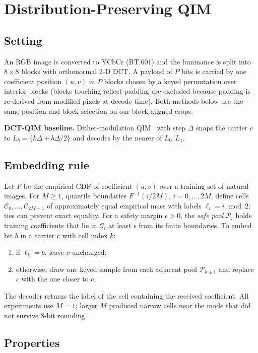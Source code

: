 \documentclass[conference,10pt]{IEEEtran}
\begin{document}
\section{Distribution-Preserving QIM}
\label{sec:method}

\subsection{Setting}
An RGB image is converted to YCbCr (BT.601) and the luminance is split into
$8{\times}8$ blocks with orthonormal 2-D DCT. A payload of $P$ bits is carried
by one coefficient position $(u,v)$ in $P$ blocks chosen by a keyed
permutation over interior blocks (blocks touching reflect-padding are excluded
because padding is re-derived from modified pixels at decode time). Both
methods below use the same position and block selection on our block-aligned crops.

\textbf{DCT-QIM baseline.} Dither-modulation QIM~\cite{Chen2001qim} with step
$\Delta$ snaps the carrier $c$ to $L_b = \{k\Delta + b\Delta/2\}$ and decodes
by the nearer of $L_0, L_1$.

\subsection{Embedding rule}
Let $F$ be the empirical CDF of coefficient $(u,v)$ over a training set of
natural images. For $M\geq1$, quantile boundaries
$F^{-1}(i/2M)$, $i=0,\dots,2M$, define cells $\mathcal{C}_0,\dots,\mathcal{C}_{2M-1}$
of approximately equal empirical mass with labels $\ell_i = i \bmod 2$;
ties can prevent exact equality. For a safety margin
$\epsilon>0$, the \emph{safe pool} $\mathcal{P}_i$ holds training coefficients
that lie in $\mathcal{C}_i$ at least $\epsilon$ from its finite boundaries.
To embed bit $b$ in a carrier $c$ with cell index $k$:
\begin{enumerate}
\item if $\ell_k = b$, leave $c$ unchanged;
\item otherwise, draw one keyed sample from each adjacent pool
$\mathcal{P}_{k\pm1}$ and replace $c$ with the one closer to $c$.
\end{enumerate}
The decoder returns the label of the cell containing the received
coefficient. All experiments use $M=1$; larger $M$ produced narrow cells near
the mode that did not survive 8-bit rounding.

\subsection{Properties}
\end{document}
